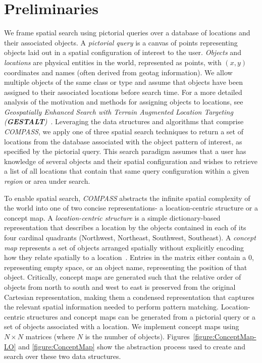 \section{Preliminaries}
\label{section:prelim}

\par{
We frame spatial search using pictorial queries over a database of locations and their associated objects.
A \textit{pictorial query} is a canvas of points representing objects laid out in a spatial configuration of interest to the user.
\textit{Objects} and \textit{locations} are physical entities in the world, represented as points, with $(x,y)$ coordinates and names (often derived from geotag information).
We allow multiple objects of the same class or type and assume that objects have been assigned to their associated locations before search time.
For a more detailed analysis of the motivation and methods for assigning objects to locations, see \textit{Geospatially Enhanced Search with Terrain Augmented Location Targeting (\textbf{GESTALT})}~\cite{Osul2023}.
Leveraging the data structures and algorithms that comprise \emph{COMPASS}, we apply one of three spatial search techniques to return a set of locations from the database associated with the object pattern of interest, as specified by the pictorial query. 
This search paradigm assumes that a user has knowledge of several objects and their spatial configuration and wishes to retrieve a list of all locations that contain that same query configuration within a given \textit{region} or area under search.
}


\par{
To enable spatial search, \emph{COMPASS} abstracts the infinite spatial complexity of the world into one of two concise representations- a location-centric structure or a concept map.
A \textit{location-centric structure} is a simple dictionary-based representation that describes a location by the objects contained in each of its four cardinal quadrants (Northwest, Northeast, Southwest, Southeast).
A \textit{concept map} represents a set of objects arranged spatially without explicitly encoding how they relate spatially to a location~\cite{Xu2010}.
Entries in the matrix either contain a $0$, representing empty space, or an object name, representing the position of that object.
Critically, concept maps are generated such that the relative order of objects from north to south and west to east is preserved from the original Cartesian representation, making them a condensed representation that captures the relevant spatial information needed to perform pattern matching.
Location-centric structures and concept maps can be generated from a pictorial query or a set of objects associated with a location. 
We implement concept maps using $N \times N$ matrices (where $N$ is the number of objects).
Figures~\ref{figure:ConceptMap-LO} and \ref{figure:ConceptMap} show the abstraction process used to create and search over these two data structures.
}

